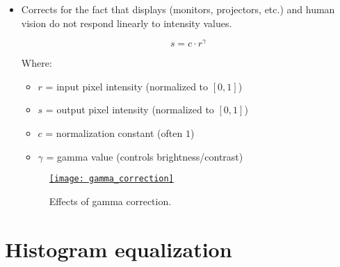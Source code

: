 \begin{itemize}
\item Corrects for the fact that displays (monitors, projectors, etc.) and
human vision do not respond linearly to intensity values.

\begin{equation}
s = c \cdot r^{\gamma}
\end{equation}

Where:
\begin{itemize}
    \item $r$ = input pixel intensity (normalized to $[0,1]$)
    \item $s$ = output pixel intensity (normalized to $[0,1]$)
    \item $c$ = normalization constant (often $1$)
    \item $\gamma$ = gamma value (controls brightness/contrast)
\end{itemize}

\begin{figure}[H]
  \vspace{-0ex}
  \centering
  \href{https://github.com/vicente-gonzalez-ruiz/medical_imaging/blob/main/notebooks/gamma_correction.ipynb}{\texttt{[image: gamma\_correction]}}
  \caption{Effects of gamma correction.}
  \label{fig:gamma correction}
\end{figure}

\end{itemize}


\section{Histogram equalization}

